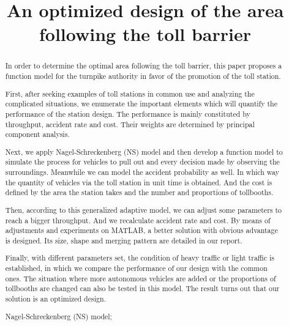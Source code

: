 \documentclass{mcmthesis}
\title{An optimized design of the area following the toll barrier }
\begin{document}
	
	
\begin{abstract}
	
In order to determine the optimal area following the toll barrier, this paper proposes a function model for the turnpike authority in favor of the promotion of the toll station.

First, after seeking examples of toll stations in common use and analyzing the complicated situations, we enumerate the important elements which will quantify the performance of the station design. The performance is mainly constituted by throughput, accident rate and cost. Their weights are determined by principal component analysis. 

Next, we apply Nagel-Schreckenberg (NS) model and then develop a function model to simulate the process for vehicles to pull out and every decision made by observing the surroundings. Meanwhile we can model the accident probability as well. In which way the quantity of vehicles via the toll station in unit time is obtained. And the cost is defined by the area the station takes and the number and proportions of tollbooths. 

Then, according to this generalized adaptive model, we can adjust some parameters to reach a bigger throughput. And we recalculate accident rate and cost. By means of adjustments and experiments on MATLAB, a better solution with obvious advantage is designed. Its size, shape and merging pattern are detailed in our report.

Finally, with different parameters set, the condition of heavy traffic or light traffic is established, in which we compare the performance of our design with the common ones. The situation where more autonomous vehicles are added or the proportions of tollbooths are changed can also be tested in this model. The result turns out that our solution is an optimized design.

   
  
  
  
\begin{keywords}
 Nagel-Schreckenberg (NS) model;
\end{keywords}
\end{abstract}

\maketitle
\tableofcontents
\clearpage
\end{document}
